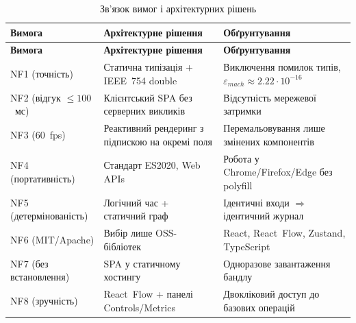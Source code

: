 \begin{longtable}[]{@{}
  >{\raggedright\arraybackslash}p{}
  >{\raggedright\arraybackslash}p{}
  >{\raggedright\arraybackslash}p{}@{}}
\caption[Зв'язок вимог і архітектурних рішень]{Зв'язок вимог і
архітектурних рішень}\tabularnewline
\toprule\noalign{}
\begin{minipage}[b]{\linewidth}\raggedright
\textbf{Вимога}
\end{minipage} & \begin{minipage}[b]{\linewidth}\raggedright
\textbf{Архітектурне рішення}
\end{minipage} & \begin{minipage}[b]{\linewidth}\raggedright
\textbf{Обґрунтування}
\end{minipage} \\
\midrule\noalign{}
\endfirsthead
\toprule\noalign{}
\begin{minipage}[b]{\linewidth}\raggedright
\textbf{Вимога}
\end{minipage} & \begin{minipage}[b]{\linewidth}\raggedright
\textbf{Архітектурне рішення}
\end{minipage} & \begin{minipage}[b]{\linewidth}\raggedright
\textbf{Обґрунтування}
\end{minipage} \\
\midrule\noalign{}
\endhead
\bottomrule\noalign{}
\endlastfoot
NF1 (точність) & Статична типізація + IEEE~754 double & Виключення
помилок типів, \(\varepsilon_{mach} \approx 2.22 \cdot 10^{-16}\) \\
NF2 (відгук \(\leq 100\)~мс) & Клієнтський SPA без серверних викликів &
Відсутність мережевої затримки \\
NF3 (60~fps) & Реактивний рендеринг з підпискою на окремі поля &
Перемальовування лише змінених компонентів \\
NF4 (портативність) & Стандарт ES2020, Web APIs & Робота у
Chrome/Firefox/Edge без polyfill \\
NF5 (детермінованість) & Логічний час + статичний граф & Ідентичні входи
\(\Rightarrow\) ідентичний журнал \\
NF6 (MIT/Apache) & Вибір лише OSS-бібліотек & React, React~Flow,
Zustand, TypeScript \\
NF7 (без встановлення) & SPA у статичному хостингу & Одноразове
завантаження бандлу \\
NF8 (зручність) & React~Flow + панелі Controls/Metrics & Двокліковий
доступ до базових операцій \\
\end{longtable}

